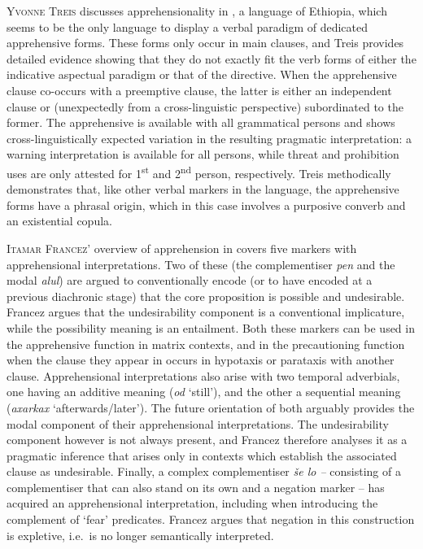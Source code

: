 \documentclass[output=paper,colorlinks,citecolor=brown]{langscibook}
\begin{document}
\textsc{Yvonne} \textsc{Treis} discusses apprehensionality in \textsc{}, a  language of Ethiopia, which seems to be the only  language to display a verbal paradigm of dedicated apprehensive forms. These forms only occur in main clauses, and Treis provides detailed evidence showing that they do not exactly fit the verb forms of either the indicative aspectual paradigm or that of the directive. When the apprehensive clause co-occurs with a preemptive clause, the latter is either an independent clause or (unexpectedly from a cross-linguistic perspective) subordinated to the former. The apprehensive is available with all grammatical persons and shows cross-linguistically expected variation in the resulting pragmatic interpretation: a warning interpretation is available for all persons, while threat and prohibition uses are only attested for 1\textsuperscript{st} and 2\textsuperscript{nd} person, respectively. Treis methodically demonstrates that, like other verbal markers in the language, the apprehensive forms have a phrasal origin, which in this case involves a purposive converb and an existential copula.



\textsc{Itamar} \textsc{Francez{}'} overview of apprehension in \textsc{} covers five markers with apprehensional interpretations. Two of these (the complementiser \textit{pen} and the modal \textit{alul}) are argued to conventionally encode (or to have encoded at a previous diachronic stage) that the core proposition is possible and undesirable. Francez argues that the undesirability component is a conventional implicature, while the possibility meaning is an entailment. Both these markers can be used in the apprehensive function in matrix contexts, and in the precautioning function when the clause they appear in occurs in hypotaxis or parataxis with another clause. Apprehensional interpretations also arise with two temporal adverbials, one having an additive meaning (\textit{od} `still'), and the other a sequential meaning (\textit{axarkax} `afterwards/later'). The future orientation of both arguably provides the modal component of their apprehensional interpretations. The undesirability component however is not always present, and Francez therefore analyses it as a pragmatic inference that arises only in contexts which establish the associated clause as undesirable. Finally, a complex complementiser \textit{še lo –} consisting of a complementiser that can also stand on its own and a negation marker – has acquired an apprehensional interpretation, including when introducing the complement of `fear' predicates. Francez argues that negation in this construction is expletive, i.e.\ is no longer semantically interpreted.
\end{document}
